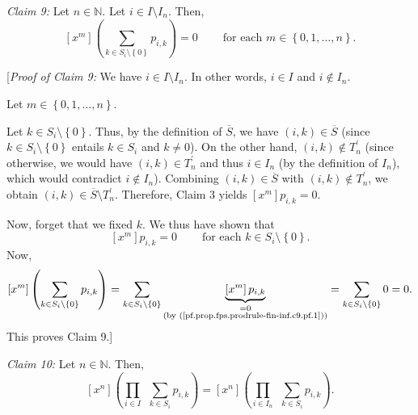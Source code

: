 \begin{statement}
\textit{Claim 9:} Let $n\in\mathbb{N}$. Let $i\in I\setminus I_{n}$. Then,
\[
\left[  x^{m}\right]  \left(  \sum_{k\in S_{i}\setminus\left\{  0\right\}
}p_{i,k}\right)  =0\ \ \ \ \ \ \ \ \ \ \text{for each }m\in\left\{
0,1,\ldots,n\right\}  .
\]

\end{statement}

[\textit{Proof of Claim 9:} We have $i\in I\setminus I_{n}$. In other words,
$i\in I$ and $i\notin I_{n}$.

Let $m\in\left\{  0,1,\ldots,n\right\}  $.

Let $k\in S_{i}\setminus\left\{  0\right\}  $. Thus, by the definition of
$\overline{S}$, we have $\left(  i,k\right)  \in\overline{S}$ (since $k\in
S_{i}\setminus\left\{  0\right\}  $ entails $k\in S_{i}$ and $k\neq0$). On the
other hand, $\left(  i,k\right)  \notin T_{n}^{\prime}$ (since otherwise, we
would have $\left(  i,k\right)  \in T_{n}^{\prime}$ and thus $i\in I_{n}$ (by
the definition of $I_{n}$), which would contradict $i\notin I_{n}$). Combining
$\left(  i,k\right)  \in\overline{S}$ with $\left(  i,k\right)  \notin
T_{n}^{\prime}$, we obtain $\left(  i,k\right)  \in\overline{S}\setminus
T_{n}^{\prime}$. Therefore, Claim 3 yields $\left[  x^{m}\right]  p_{i,k}=0$.

Now, forget that we fixed $k$. We thus have shown that
\begin{equation}
\left[  x^{m}\right]  p_{i,k}=0\ \ \ \ \ \ \ \ \ \ \text{for each }k\in
S_{i}\setminus\left\{  0\right\}  .
\label{pf.prop.fps.prodrule-fin-inf.c9.pf.1}%
\end{equation}
Now,%
\[
\left[  x^{m}\right]  \left(  \sum_{k\in S_{i}\setminus\left\{  0\right\}
}p_{i,k}\right)  =\sum_{k\in S_{i}\setminus\left\{  0\right\}  }%
\underbrace{\left[  x^{m}\right]  p_{i,k}}_{\substack{=0\\\text{(by
(\ref{pf.prop.fps.prodrule-fin-inf.c9.pf.1}))}}}=\sum_{k\in S_{i}%
\setminus\left\{  0\right\}  }0=0.
\]
This proves Claim 9.]

\begin{statement}
\textit{Claim 10:} Let $n\in\mathbb{N}$. Then,%
\[
\left[  x^{n}\right]  \left(  \prod_{i\in I}\ \ \sum_{k\in S_{i}}%
p_{i,k}\right)  =\left[  x^{n}\right]  \left(  \prod_{i\in I_{n}}%
\ \ \sum_{k\in S_{i}}p_{i,k}\right)  .
\]

\end{statement}

